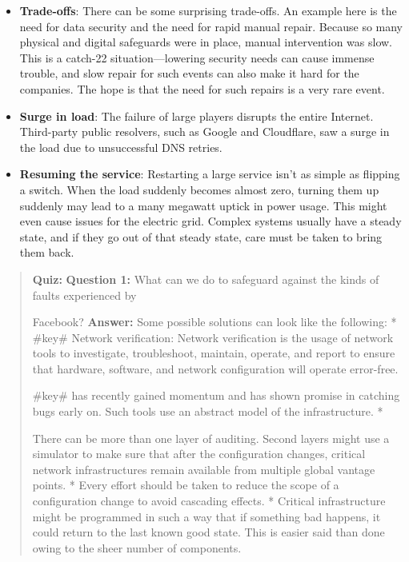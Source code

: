 \begin{itemize}
\item
\protect{}\label{ub-YjIjyq0ydWPaeRkjZW}
\textbf{Trade-offs}: There can be some surprising trade-offs. An example here is the need for data security and the need for rapid manual repair. Because so many physical and digital safeguards were in place, manual intervention was slow. This is a catch-22 situation---lowering security needs can cause immense trouble, and slow repair for such events can also make it hard for the companies. The hope is that the need for such repairs is a very rare event.
\item
\protect{}\label{EJfwDo9Chc1usslbGQ5hy}
\textbf{Surge in load}: The failure of large players disrupts the entire Internet. Third-party public resolvers, such as Google and Cloudflare, saw a surge in the load due to unsuccessful DNS retries.
\item
\protect{}\label{dqu0CKjvMujCbjNCwXUCu}
\textbf{Resuming the service}: Restarting a large service isn't as simple as flipping a switch. When the load suddenly becomes almost zero, turning them up suddenly may lead to a many megawatt uptick in power usage. This might even cause issues for the electric grid. Complex systems usually have a steady state, and if they go out of that steady state, care must be taken to bring them back.
\end{itemize}

\begin{quote}
\textbf{Quiz:}
\textbf{Question 1:} What can we do to safeguard against the kinds of faults experienced by

Facebook?
\textbf{Answer:} Some possible solutions can look like the following: * \#key\# Network verification: Network verification is the usage of network tools to investigate, troubleshoot, maintain, operate, and report to ensure that hardware, software, and network configuration will operate error-free.

\#key\# has recently gained momentum and has shown promise in catching bugs early on. Such tools use an abstract model of the infrastructure. *

There can be more than one layer of auditing. Second layers might use a simulator to make sure that after the configuration changes, critical network infrastructures remain available from multiple global vantage points. * Every effort should be taken to reduce the scope of a configuration change to avoid cascading effects. * Critical infrastructure might be programmed in such a way that if something bad happens, it could return to the last known good state. This is easier said than done owing to the sheer number of components.
\end{quote}




